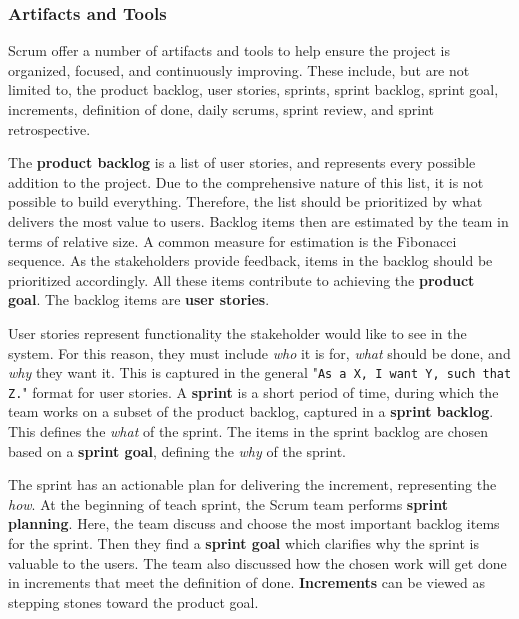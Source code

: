 \subsubsection*{Artifacts and Tools}
Scrum offer a number of artifacts and tools to help ensure the project is organized, focused, and continuously improving. These include, but are not limited to, the product backlog, user stories, sprints, sprint backlog, sprint goal, increments, definition of done, daily scrums, sprint review, and sprint retrospective.\cite{sutherlandScrumArtDoing2014}

The \textbf{product backlog} is a list of user stories, and represents every possible addition to the project.
Due to the comprehensive nature of this list, it is not possible to build everything.
Therefore, the list should be prioritized by what delivers the most value to users.
Backlog items then are estimated by the team in terms of relative size.
A common measure for estimation is the Fibonacci sequence.
As the stakeholders provide feedback, items in the backlog should be prioritized accordingly.
All these items contribute to achieving the \textbf{product goal}.
The backlog items are \textbf{user stories}.

User stories represent functionality the stakeholder would like to see in the system.
For this reason, they must include \textit{who} it is for, \textit{what} should be done, and \textit{why} they want it.
This is captured in the general "\texttt{As a X, I want Y, such that Z.}" format for user stories.
A \textbf{sprint} is a short period of time, during which the team works on a subset of the product backlog, captured in a \textbf{sprint backlog}.
This defines the \textit{what} of the sprint.
The items in the sprint backlog are chosen based on a \textbf{sprint goal}, defining the \textit{why} of the sprint.


The sprint has an actionable plan for delivering the increment, representing the \textit{how}. 
At the beginning of teach sprint, the Scrum team performs \textbf{sprint planning}.
Here, the team discuss and choose the most important backlog items for the sprint.
Then they find a \textbf{sprint goal} which clarifies why the sprint is valuable to the users.
The team also discussed how the chosen work will get done in increments that meet the definition of done.
\textbf{Increments} can be viewed as stepping stones toward the product goal.

